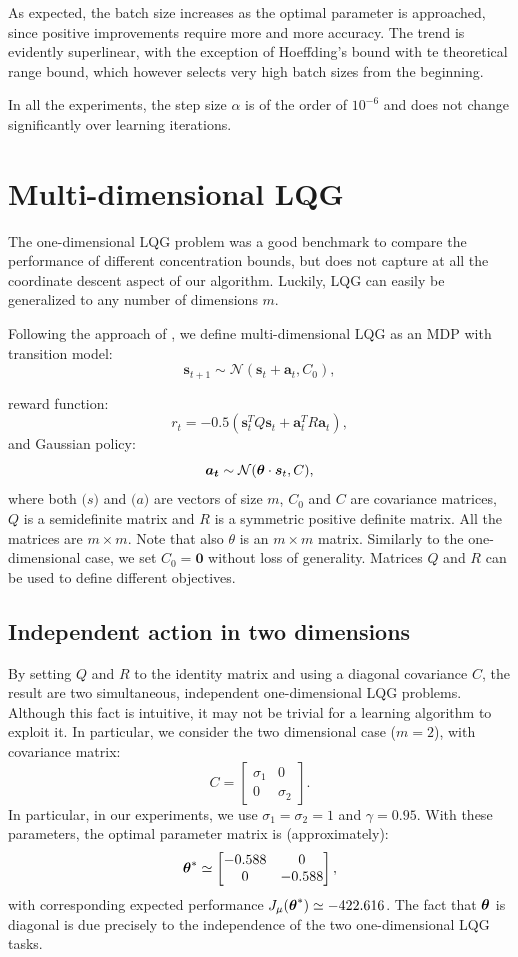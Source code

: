 As expected, the batch size increases as the optimal parameter is approached, since positive improvements require more and more accuracy. The trend is evidently superlinear, with the exception of Hoeffding's bound with te theoretical range bound, which however selects very high batch sizes from the beginning. 

In all the experiments, the step size $\alpha$ is of the order of $10^{-6}$ and does not change significantly over learning iterations.


\section{Multi-dimensional LQG}
The one-dimensional \ac{LQG} problem was a good benchmark to compare the performance of different concentration bounds, but does not capture at all the coordinate descent aspect of our algorithm. Luckily, \ac{LQG} can easily be generalized to any number of dimensions $m$.

Following the approach of \cite{Pirotta:2015:MRL:2888116.2888124}, we define multi-dimensional \ac{LQG} as an \ac{MDP} with transition model:
\[
	\boldsymbol{s}_{t+1} \sim \mathcal{N}(\boldsymbol{s}_t+\boldsymbol{a}_t,C_0),
\] 

reward function:
\[
	r_t=-0.5(\boldsymbol{s}_t^TQ\boldsymbol{s}_t + \boldsymbol{a}_t^TR\boldsymbol{a}_t),
\]
and Gaussian policy:
\[
	\boldsymbol{a_t} \sim \mathcal{N}(\boldsymbol{\theta} \cdot \boldsymbol{s}_t,C),
\]
where both $\boldsymbol(s)$ and $\boldsymbol(a)$ are vectors of size $m$, $C_0$ and $C$ are covariance matrices, $Q$ is a semidefinite matrix and $R$ is a symmetric positive definite matrix. All the matrices are $m\times m$. Note that also $\theta$ is an $m \times m$ matrix. Similarly to the one-dimensional case, we set $C_0=\boldsymbol{0}$ without loss of generality. Matrices $Q$ and $R$ can be used to define different objectives.

\subsection{Independent action in two dimensions}
By setting $Q$ and $R$ to the identity matrix and using a diagonal covariance $C$, the result are two simultaneous, independent one-dimensional \ac{LQG} problems. Although this fact is intuitive, it may not be trivial for a learning algorithm to exploit it. In particular, we consider the two dimensional case ($m=2$), with covariance matrix:
\[
	C = 
	\begin{bmatrix}
	\sigma_1 & 0 		\\
	0		 & \sigma_2
	\end{bmatrix}.
\]
In particular, in our experiments, we use $\sigma_1 = \sigma_2 = 1$ and $\gamma = 0.95$. With these parameters, the optimal parameter matrix is (approximately):
\[
	\boldsymbol{\theta}^* \simeq 
	\begin{bmatrix}
	-0.588 & 0 		\\
	0		 & -0.588
	\end{bmatrix},
\]
with corresponding expected performance $J_\mu(\boldsymbol{\theta}^*) \simeq -422.616$. The fact that $\boldsymbol{\theta}$ is diagonal is due precisely to the independence of the two one-dimensional \ac{LQG} tasks.